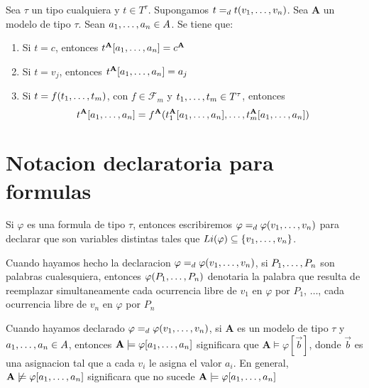 \begin{lemma}
  Sea $\tau$ un tipo cualquiera y $t \in T^\tau$. Supongamos $t =_d t(v_{1}, \dots, v_{n})$. Sea
  $\mathbf{A}$ un modelo de tipo $\tau$. Sean $a_{1}, \dots, a_{n} \in A$. Se tiene que: \begin{enumerate}
    \item Si $t = c$, entonces $t^\mathbf{A}[a_{1}, \dots, a_{n}] = c^\mathbf{A}$
    \item Si $t = v_j$, entonces $t^\mathbf{A}[a_{1}, \dots, a_{n}] = a_j$
    \item Si $t = f(t_{1}, \dots, t_{m})$, con $f \in \mathcal{F}_m$ y $t_{1}, \dots, t_{m} \in T^\tau$, entonces
    $$
    t^\mathbf{A}[a_{1}, \dots, a_{n}] = f^\mathbf{A}(t_1^\mathbf{A}[a_{1}, \dots, a_{n}],\dots, t_m^\mathbf{A}[a_{1}, \dots, a_{n}])
    $$
  \end{enumerate}
\end{lemma}

\section{Notacion declaratoria para formulas}
\begin{definition}
  Si $\varphi$ es una formula de tipo $\tau$, entonces escribiremos $\varphi =_d \varphi(v_{1}, \dots, v_{n})$ para 
  declarar que  son variables distintas tales que $Li(\varphi) \subseteq \{v_{1}, \dots, v_{n}\}$.
\end{definition}

\begin{convention}
  Cuando hayamos hecho la declaracion $\varphi =_d \varphi(v_{1}, \dots, v_{n})$, si $P_{1}, \dots, P_{n}$ son palabras 
  cualesquiera, entonces $\varphi(P_{1}, \dots, P_{n})$ denotaria la palabra que resulta de 
  reemplazar simultaneamente cada ocurrencia libre de $v_1$ en $\varphi$ por $P_1$, $\dots$, cada ocurrencia libre de $v_n$
  en $\varphi$ por $P_n$ 
\end{convention}

\begin{convention}
  Cuando hayamos declarado $\varphi =_d \varphi(v_{1}, \dots, v_{n})$, si $\mathbf{A}$ es un modelo 
  de tipo $\tau$ y $a_{1}, \dots, a_{n} \in A$, entonces $\mathbf{A} \models \varphi[a_{1}, \dots, a_{n}]$
  significara que $\mathbf{A}\models\varphi[\vec{b}]$, donde $\vec{b}$ es una asignacion tal que a 
  cada $v_i$ le asigna el valor $a_i$. En general, $\mathbf{A}\not\models\varphi[a_{1}, \dots, a_{n}]$ significara que
  no sucede $\mathbf{A}\models\varphi[a_{1}, \dots, a_{n}]$
\end{convention}

